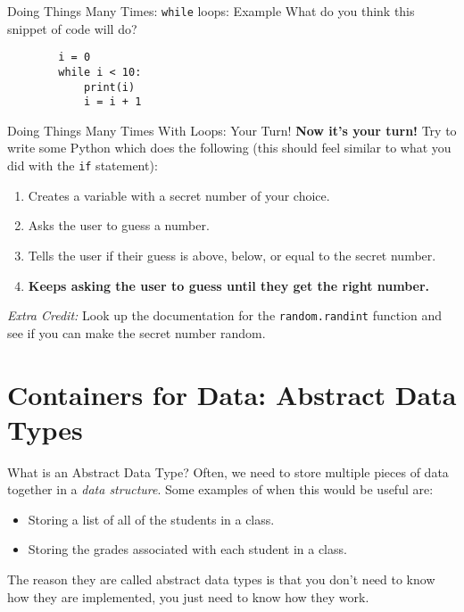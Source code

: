 \documentclass{acm}
\begin{document}
\begin{frame}[fragile]{Doing Things Many Times: \texttt{while} loops: Example}
    What do you think this snippet of code will do?

    \begin{verbatim}
        i = 0
        while i < 10:
            print(i)
            i = i + 1
    \end{verbatim}
\end{frame}

\begin{frame}[fragile]{Doing Things Many Times With Loops: Your Turn!}
    \textbf{Now it's your turn!} Try to write some Python which does the
    following (this should feel similar to what you did with the \texttt{if}
    statement):

    \begin{enumerate}
        \item Creates a variable with a secret number of your choice.
        \item Asks the user to guess a number.
        \item Tells the user if their guess is above, below, or equal to the
            secret number.
        \item \textbf{Keeps asking the user to guess until they get the right
            number.}
    \end{enumerate}

    \textit{Extra Credit:} Look up the documentation for the
    \texttt{random.randint} function and see if you can make the secret number
    random.
\end{frame}

\section{Containers for Data: Abstract Data Types}
\begin{frame}{What is an Abstract Data Type?}
    Often, we need to store multiple pieces of data together in a \textit{data
    structure}. Some examples of when this would be useful are:

    \begin{itemize}
        \item Storing a list of all of the students in a class.
        \item Storing the grades associated with each student in a class.
    \end{itemize}

    The reason they are called abstract data types is that you don't need to
    know how they are implemented, you just need to know how they work.
\end{frame}
\end{document}
